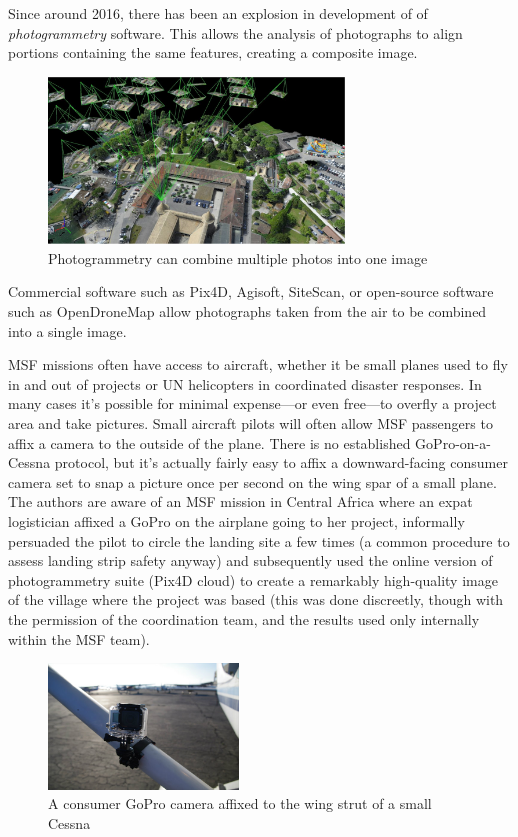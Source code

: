 \documentclass[a4paper,12pt,twoside]{article}
\begin{document}
Since around 2016, there has been an explosion in development of of \textit{photogrammetry} software. This allows the analysis of photographs to align portions containing the same features, creating a composite image. 

\begin{figure}[H]
    \centering
    \includegraphics[width=0.7\textwidth]{images/rayCloud-pix4d-parallax-black.jpg}
    \caption{Photogrammetry can combine multiple photos into one image}
    \label{fig:Photogrammetry}
\end{figure}

Commercial software such as Pix4D, Agisoft, SiteScan, or open-source software such as OpenDroneMap allow photographs taken from the air to be combined into a single image. 

MSF missions often have access to aircraft, whether it be small planes used to fly in and out of projects or UN helicopters in coordinated disaster responses. In many cases it's possible for minimal expense---or even free---to overfly a project area and take pictures. Small aircraft pilots will often allow MSF passengers to affix a camera to the outside of the plane. There is no established GoPro-on-a-Cessna protocol, but it's actually fairly easy to affix a downward-facing consumer camera set to snap a picture once per second on the wing spar of a small plane. The authors are aware of an MSF mission in Central Africa where an expat logistician affixed a GoPro on the airplane going to her project, informally persuaded the pilot to circle the landing site a few times (a common procedure to assess landing strip safety anyway) and subsequently used the online version of photogrammetry suite (Pix4D cloud) to create a remarkably high-quality image of the village where the project was based (this was done discreetly, though with the permission of the coordination team, and the results used only internally within the MSF team). 

\begin{figure}[H]
    \centering
    \includegraphics[width=0.45\textwidth]{images/GoPro_Cessna.jpg}
    \caption{A consumer GoPro camera affixed to the wing strut of a small Cessna}
    \label{fig:GoPro Cessna}
\end{figure}
\end{document}
